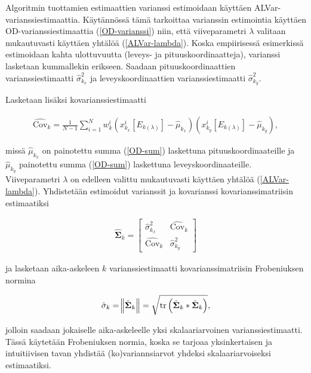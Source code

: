 \documentclass[
  12pt,
  a4paper, twoside]{book}
\begin{document}
Algoritmin tuottamien estimaattien varianssi estimoidaan käyttäen ALVar-varianssiestimaattia. Käytännössä tämä tarkoittaa varianssin estimointia käyttäen OD-varianssiestimaattia (\ref{OD-varianssi}) niin, että viiveparametri \(\lambda\) valitaan mukautuvasti käyttäen yhtälöä (\ref{ALVar-lambda}). Koska empiirisessä esimerkissä estimoidaan kahta ulottuvuutta (leveys- ja pituuskoordinaatteja), varianssi lasketaan kummallekin erikseen. Saadaan pituuskoordinaattien varianssiestimaatti \(\hat{\sigma}^2_{k_x}\) ja leveyskoordinaattien varianssiestimaatti \(\hat{\sigma}^2_{k_y}\).

Lasketaan lisäksi kovarianssiestimaatti

\begin{align}\label{ALVar-kovarianssi}
\hat{\text{Cov}}_k = \frac{1}{N-1} \sum_{i=1}^N w_k^i (x_{k_{x}}^i[E_{k(\lambda)}]-\hat{\mu}_{k_x})(x_{k_y}^i[E_{k(\lambda)}]-\hat{\mu}_{k_y})
,\end{align}

\noindent missä \(\hat{\mu}_{k_x}\) on painotettu summa (\ref{OD-sum}) laskettuna pituuskoordinaateille ja \(\hat{\mu}_{k_y}\) painotettu summa (\ref{OD-sum}) laskettuna leveyskoordinaateille. Viiveparametri \(\lambda\) on edelleen valittu mukautuvasti käyttäen yhtälöä (\ref{ALVar-lambda}). Yhdistetään estimoidut varianssit ja kovarianssi kovarianssimatriisin estimaatiksi

\begin{align}\label{ALVar-kovarianssimatriisi}
\hat{\mathbf{\Sigma}}_k = \begin{bmatrix} \hat{\sigma}^2_{k_x} & \hat{\text{Cov}}_k \\ \hat{\text{Cov}}_k & \hat{\sigma}^2_{k_y} \end{bmatrix}
\end{align}

\noindent ja lasketaan aika-askeleen \(k\) varianssiestimaatti kovarianssimatriisin Frobeniuksen normina

\begin{align}\label{WB-varianssi}
\hat{\sigma}_k = \norm{ \hat{\mathbf{\Sigma}}_k } = \sqrt{ \text{tr}\left(\hat{\mathbf{\Sigma}}_k * \hat{\mathbf{\Sigma}}_k\right)}
,\end{align}

\noindent jolloin saadaan jokaiselle aika-askeleelle yksi skalaariarvoinen varianssiestimaatti. Tässä käytetään Frobeniuksen normia, koska se tarjoaa yksinkertaisen ja intuitiivisen tavan yhdistää (ko)variannsiarvot yhdeksi skalaariarvoiseksi estimaatiksi.
\end{document}
